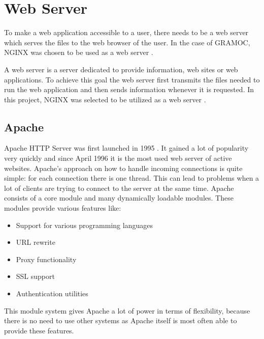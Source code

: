 \chapter{Web Server}
\label{sec:webserver}

\author{Nico Leidenfrost}
%
To make a web application accessible to a user, there needs to be a web server which serves the files to the web browser of the user. In the case of GRAMOC, NGINX was chosen to be used as a web server \autocite{nginx}.

A web server is a server dedicated to provide information, web sites or web applications. To achieve this goal the web server first transmits the files needed to run the web application and then sends information whenever it is requested. In this project, NGINX was selected to be utilized as a web server \autocite{nginx}.

\section{Apache}
Apache HTTP Server was first launched in 1995 \autocite{apache}. It gained a lot of popularity very quickly and since April 1996 it is the most used web server of active websites. Apache's approach on how to handle incoming connections is quite simple: for each connection there is one thread. This can lead to problems when a lot of clients are trying to connect to the server at the same time. Apache consists of a core module and many dynamically loadable modules. These modules provide various features like:

\begin{itemize}
    \item Support for various programming languages
    \item URL rewrite
    \item Proxy functionality
    \item SSL support
    \item Authentication utilities
\end{itemize}

This module system gives Apache a lot of power in terms of flexibility, because there is no need to use other systems as Apache itself is most often able to provide these features.

